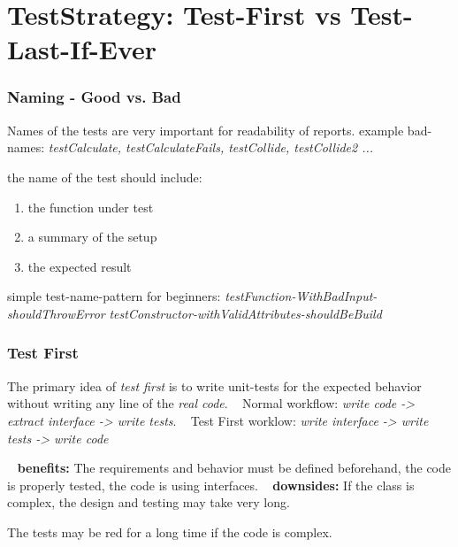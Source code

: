 \documentclass[12pt]{beamer}
\begin{document}
	\section{TestStrategy: Test-First vs Test-Last-If-Ever}
	
	\begin{frame}
		\frametitle{Naming - Good vs. Bad}
		Names of the tests are very important for readability of reports. 
		example bad-names: \textit{testCalculate, testCalculateFails, testCollide, testCollide2 ...}
		
		the name of the test should include:
		\begin{enumerate}
			\item the function under test
			\item a summary of the setup 
			\item the expected result
		\end{enumerate}
	
		simple test-name-pattern for beginners: \newline
		\textit{testFunction-WithBadInput-shouldThrowError} \newline
		\textit{testConstructor-withValidAttributes-shouldBeBuild}
	\end{frame}
	
	\begin{frame}
		\frametitle{Test First}
		The primary idea of \textit{test first} is to write unit-tests for the expected behavior without writing any line of the \textit{real code}. 
		~\newline
		Normal workflow: \textit{write code -> extract interface -> write tests}. 
		~\newline
		Test First worklow: \textit{write interface -> write tests -> write code}

		~\newline
		\textbf{benefits:} The requirements and behavior must be defined beforehand, the code is properly tested, the code is using interfaces.
		~\newline
		\textbf{downsides:} If the class is complex, the design and testing may take very long. 
		
		The tests may be red for a long time if the code is complex. 	

	\end{frame}
\end{document}
